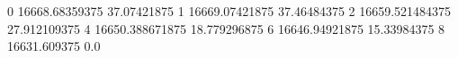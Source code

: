 0 16668.68359375 37.07421875
1 16669.07421875 37.46484375
2 16659.521484375 27.912109375
4 16650.388671875 18.779296875
6 16646.94921875 15.33984375
8 16631.609375 0.0
